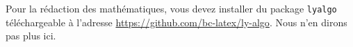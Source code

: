 Pour la rédaction des mathématiques, vous devez installer du package \verb+lyalgo+ téléchar\-geable à l'adresse \url{https://github.com/bc-latex/ly-algo}. Nous n'en dirons pas plus ici.